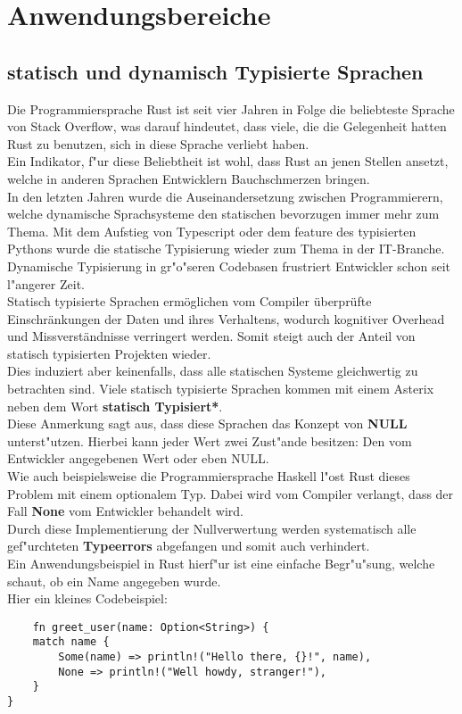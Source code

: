 \chapter{Anwendungsbereiche} %
\label{cha:Anwendungsbereiche}
\section{statisch und dynamisch Typisierte Sprachen}
Die Programmiersprache Rust ist seit vier Jahren in Folge die beliebteste Sprache von Stack Overflow, was darauf hindeutet, dass viele, die die Gelegenheit hatten Rust zu benutzen, sich in diese Sprache verliebt haben. \autocite{so-rust-loved}\\
Ein Indikator, f"ur diese Beliebtheit ist wohl, dass Rust an jenen Stellen ansetzt, welche in anderen Sprachen Entwicklern Bauchschmerzen bringen.\\
In den letzten Jahren wurde die Auseinandersetzung zwischen Programmierern, welche dynamische Sprachsysteme den statischen bevorzugen immer mehr zum Thema. Mit dem Aufstieg von Typescript oder dem feature des typisierten Pythons wurde die statische Typisierung wieder zum Thema in der IT-Branche.\\
Dynamische Typisierung in gr"o"seren Codebasen frustriert Entwickler schon seit l"angerer Zeit. \\
Statisch typisierte Sprachen ermöglichen vom Compiler überprüfte Einschränkungen der Daten und ihres Verhaltens, wodurch kognitiver Overhead und Missverständnisse verringert werden. Somit steigt auch der Anteil von statisch typisierten Projekten wieder. \\
Dies induziert aber keinenfalls, dass alle statischen Systeme gleichwertig zu betrachten sind. Viele statisch typisierte Sprachen kommen mit einem Asterix neben dem Wort \textbf{statisch Typisiert*}.\\
Diese Anmerkung sagt aus, dass diese Sprachen das Konzept von \textbf{NULL} unterst"utzen.
Hierbei kann jeder Wert zwei Zust"ande besitzen: Den vom Entwickler angegebenen Wert oder eben NULL. \\
Wie auch beispielsweise die Programmiersprache Haskell l"ost Rust dieses Problem mit einem optionalem Typ. Dabei wird vom Compiler verlangt, dass der Fall \textbf{None} vom Entwickler behandelt wird.\\
Durch diese Implementierung der Nullverwertung werden systematisch alle gef"urchteten \textbf{Typeerrors} abgefangen und somit auch verhindert.\\
Ein Anwendungsbeispiel in Rust hierf"ur ist eine einfache Begr"u"sung, welche schaut, ob ein Name angegeben wurde.\\
Hier ein kleines Codebeispiel:
\newpage
\begin{verbatim}
    fn greet_user(name: Option<String>) {
    match name {
        Some(name) => println!("Hello there, {}!", name),
        None => println!("Well howdy, stranger!"),
    }
}

 \end{verbatim}
\begin{lstlisting}[caption={Optionale Typisierung}, label={lst:optionaltypes}]
 \end{lstlisting}

